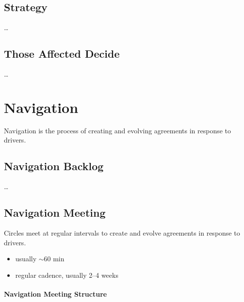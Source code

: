 \section{Strategy}
\label{strategy}

{\ldots}

\section{Those Affected Decide}
\label{thoseaffecteddecide}

{\ldots}

\chapter{Navigation}
\label{navigation}

Navigation is the process of creating and evolving agreements in response to drivers.

\section{Navigation Backlog}
\label{navigationbacklog}

{\ldots}

\section{Navigation Meeting}
\label{navigationmeeting}

Circles meet at regular intervals to create and evolve agreements in response to drivers.

\begin{itemize}
\item usually \ensuremath{\sim}60 min

\item regular cadence, usually 2--4 weeks

\end{itemize}

\subsubsection{Navigation Meeting Structure}
\label{navigationmeetingstructure}

